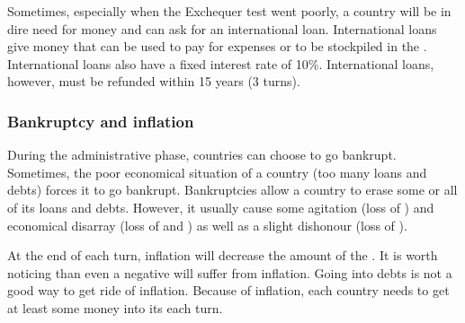  Sometimes, especially when the Exchequer test
went poorly, a country will be in dire need for money and can ask for an
international loan.
\bparag International loans give money that can be used to pay for expenses or
to be stockpiled in the \RT.
\bparag International loans also have a fixed interest rate of 10\%.
\bparag International loans, however, must be refunded within 15 years (3
turns).


\subsubsection{Bankruptcy and inflation}
\aparag[Bankruptcy] During the administrative phase, countries can choose to
go bankrupt.
\bparag Sometimes, the poor economical situation of a country (too many loans
and debts) forces it to go bankrupt.
\bparag Bankruptcies allow a country to erase some or all of its loans and
debts.
\bparag However, it usually cause some agitation (loss of \STAB) and
economical disarray (loss of \TradeFLEET and \MNU) as well as a slight
dishonour (loss of \VPs).

\aparag[Inflation] At the end of each turn, inflation will decrease the amount
of the \RT.
\bparag It is worth noticing than even a negative \RT will suffer from
inflation. Going into debts is not a good way to get ride of inflation.
\bparag Because of inflation, each country needs to get at least some money
into its \RT each turn.

